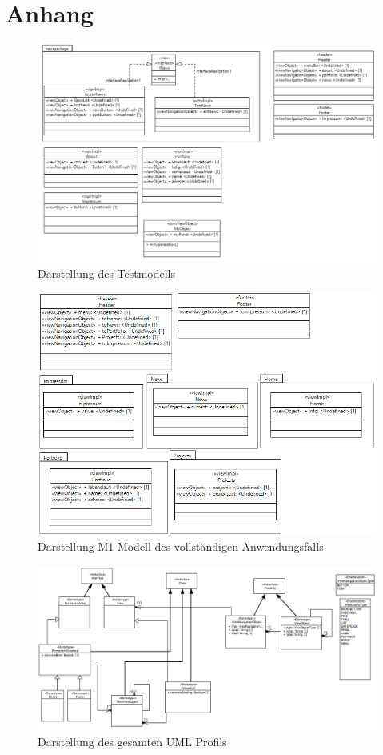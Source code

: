 \chapter*{Anhang} \label{Anhang}

\begin{figure}[ht]
\begin{center}
\includegraphics[width=0.7\textheight, angle=90]{./img/GWT-Model.png}
\caption{Darstellung des Testmodells}
\end{center}
\end{figure}

\begin{figure}[ht]
\begin{center}
\includegraphics[width=0.7\textheight, angle=90]{./img/Model2.png}
\caption{Darstellung M1 Modell des vollständigen Anwendungsfalls}
\end{center}
\end{figure}

\begin{figure}[ht]
\begin{center}
\includegraphics[width=\textheight, angle=90]{./img/Profil.png}
\caption{Darstellung des gesamten UML Profils}
\end{center}
\end{figure}